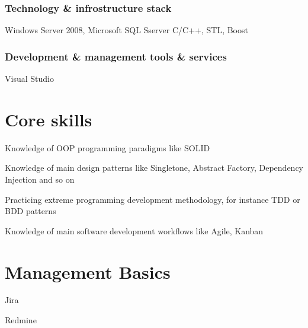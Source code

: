 \documentclass[9pt, a4paper, english]{extarticle}
\begin{document}
    \subsubsection* {Technology \& infrostructure stack}
      Windows Server 2008, Microsoft SQL Sserver C/C++, STL, Boost
    \subsubsection* {Development \& management tools \& services}
      Visual Studio

\section* {Core skills}
  \begin {list}{\textbullet}{\itemsep=0mm}
    \item Knowledge of OOP programming paradigms like SOLID
    \item Knowledge of main design patterns like Singletone, Abstract Factory,
      Dependency Injection and so on
    \item Practicing extreme programming development methodology, for instance
      TDD or BDD patterns 
    \item Knowledge of main software development workflows like Agile, Kanban
  \end{list}

\pagebreak

\section* {Management Basics}
  \begin{multicols}{2}
    \begin {list}{\textbullet}{\itemsep=0mm}
      \item Jira
        \columnbreak
      \item Redmine
    \end{list}
  \end{multicols}
\end{document}
